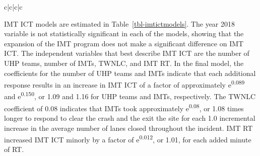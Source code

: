 \documentclass[
  letterpaper,
  authoryear]{elsarticle}
\begin{document}
\begin{table}
{\begin{tabular}[t]{c|c|c|c}
\begin{table}
IMT ICT models are estimated in Table~\ref{tbl-imtictmodels}. The year
2018 variable is not statistically significant in each of the models,
showing that the expansion of the IMT program does not make a
significant difference on IMT ICT. The independent variables that best
describe IMT ICT are the number of UHP teams, number of IMTs, TWNLC, and
IMT RT. In the final model, the coefficients for the number of UHP teams
and IMTs indicate that each additional response results in an increase
in IMT ICT of a factor of approximately e\textsuperscript{0.089} and
e\textsuperscript{0.150}, or 1.09 and 1.16 for UHP teams and IMTs,
respectively. The TWNLC coefficient of 0.08 indicates that IMTs took
approximately e\textsuperscript{0.08}, or 1.08 times longer to respond
to clear the crash and the exit the site for each 1.0 incremental
increase in the average number of lanes closed throughout the incident.
IMT RT increased IMT ICT minorly by a factor of
e\textsuperscript{0.012}, or 1.01, for each added minute of RT.

\begin{table}

\caption{\label{tbl-imtictmodels}Estimated Models of IMT ICT}

\end{table}
\end{table}
\end{tabular}}
\end{table}
\end{document}
